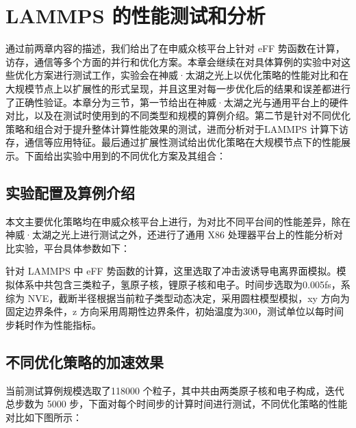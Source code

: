 
\chapter{LAMMPS 的性能测试和分析}
通过前两章内容的描述，我们给出了在申威众核平台上针对 eFF 势函数在计算，访存，通信等多个方面的并行和优化方案。本章会继续在对具体算例的实验中对这些优化方案进行测试工作，实验会在神威·太湖之光上以优化策略的性能对比和在大规模节点上以扩展性的形式呈现，并且这里对每一步优化后的结果和误差都进行了正确性验证。本章分为三节，第一节给出在神威·太湖之光与通用平台上的硬件对比，以及在测试时使用到的不同类型和规模的算例介绍。第二节是针对不同优化策略和组合对于提升整体计算性能效果的测试，进而分析对于LAMMPS 计算下访存，通信等应用特征。最后通过扩展性测试给出优化策略在大规模节点下的性能展示。下面给出实验中用到的不同优化方案及其组合：

\section{实验配置及算例介绍}
本文主要优化策略均在申威众核平台上进行，为对比不同平台间的性能差异，除在神威·太湖之光上进行测试之外，还进行了通用 X86 处理器平台上的性能分析对比实验，平台具体参数如下：

针对 LAMMPS 中 eFF 势函数的计算，这里选取了冲击波诱导电离界面模拟。模拟体系中共包含三类粒子，氢原子核，锂原子核和电子。时间步选取为0.005fs，系综为 NVE，截断半径根据当前粒子类型动态决定，采用圆柱模型模拟，xy 方向为固定边界条件，z 方向采用周期性边界条件，初始温度为300，测试单位以每时间步耗时作为性能指标。

\section{不同优化策略的加速效果}
当前测试算例规模选取了118000 个粒子，其中共由两类原子核和电子构成，迭代总步数为 5000 步，下面对每个时间步的计算时间进行测试，不同优化策略的性能对比如下图所示：

